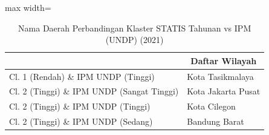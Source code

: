 \begin{table}[H]
\centering
\caption{Nama Daerah Perbandingan Klaster STATIS Tahunan vs IPM (UNDP) (2021)} \label{tab:sample1statis_ipm_name_2021}
\begin{adjustbox}{max width=\textwidth}
\begin{tabular}{|>{\centering\arraybackslash}p{4cm}|p{10cm}|}
\hline
\multicolumn{1}{|c|}{\textbf{Kategori}} & \multicolumn{1}{c|}{\textbf{Daftar Wilayah}} \\
\hline
Cl. 1 (Rendah) \& IPM UNDP (Tinggi) & Kota Tasikmalaya \\
\hline
Cl. 2 (Tinggi) \& IPM UNDP (Sangat Tinggi) & Kota Jakarta Pusat \\
\hline
Cl. 2 (Tinggi) \& IPM UNDP (Tinggi) & Kota Cilegon \\
\hline
Cl. 2 (Tinggi) \& IPM UNDP (Sedang) & Bandung Barat \\
\hline
\end{tabular}
\end{adjustbox}
\end{table}